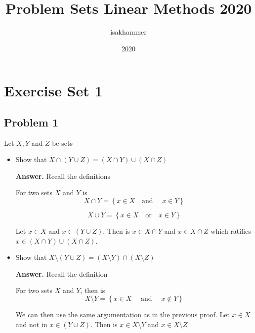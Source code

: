 \documentclass{article}
\title{Problem Sets Linear Methods 2020}
\author{isakhammer }
\date{2020}
\theoremstyle{remark}
\begin{document}
\maketitle
\tableofcontents
\newpage

\newpage
\section{Exercise Set 1}%
\label{sec:exercise_set_1}

\subsection{Problem 1}%
\label{sub:problem_1}

Let $X,Y$ and $Z$ be sets
\begin{itemize}
  \item Show that $X\cap \left( Y\cup Z \right) = \left( X\cap Y \right) \cup  \left( X\cap Z \right)$ 
    \begin{tcolorbox}
      \textbf{Answer.}  
      Recall the definitions
      \begin{definition}
        For two sets $X$ and $Y$ is \[
        X \cap  Y = \left\{ x \in  X \quad   \text{and } \quad  x \in  Y  \right\}
        \] 
        
         \[
        X \cup Y = \left\{ x \in X \quad \text{or} \quad   x \in  Y \right\}
        \] 
      \end{definition}

      Let $ x \in  X$ and  $x \in  \left( Y \cup  Z \right)$. Then is $x \in  X \cap Y$ and $x \in  X \cap  Z$ which ratifies $x \in  \left( X \cap Y \right) \cup  \left( X \cap Z \right)$.

    \end{tcolorbox}

  \item Show that $X\setminus \left( Y\cup Z \right) = \left( X \setminus Y \right) \cap  \left( X \setminus Z \right)$
    \begin{tcolorbox}
      \textbf{Answer.} 
      Recall the definition 
      \begin{definition}
        For two sets $X$ and $Y$, then is \[
        X \setminus Y  = \left\{ x \in X \quad \text{ and } \quad x \not\in Y   \right\}
        \]  
      \end{definition}
      We can then use the same argumentation as in the previous proof. Let  $x \in  X$ and not in $x \in \left( Y \cup   Z  \right)$. Then is $x \in  X \setminus  Y$  and $ x \in X \setminus  Z$
    \end{tcolorbox}
\end{itemize}
\end{document}
